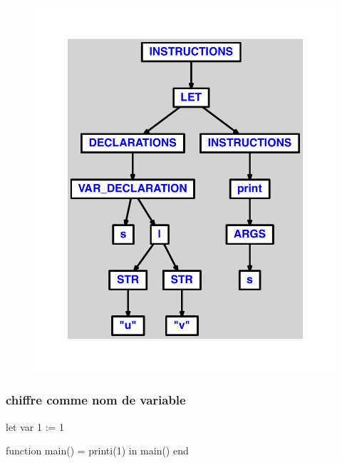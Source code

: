 \documentclass{article}
\begin{document}
\begin{figure}[H]\centering\includegraphics[max width=\textwidth]{ast/ast_291.pdf}\end{figure}\subsubsection{chiffre comme nom de variable}
\begin{verbatimtab}
let
	var 1 := 1

	function main() = printi(1)
in main() end
\end{verbatimtab}
\end{document}

